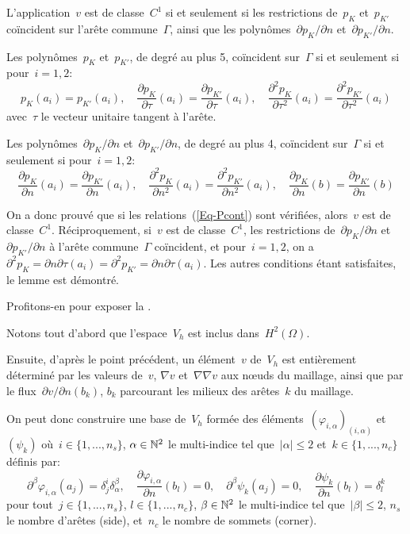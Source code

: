L'application~$v$ est de classe~$C^1$ si et seulement si les restrictions de~$p_K$ et~$p_{K'}$ coïncident sur l'arête commune~$\Gamma$, ainsi que les polynômes~$\partial p_K/\partial n$ et~$\partial p_{K'}/\partial n$.

Les polynômes~$p_K$ et~$p_{K'}$, de degré au plus 5, coïncident sur~$\Gamma$ si et seulement si pour~$i=1,2$:
\[ p_K(a_i)=p_{K'}(a_i), \quad
\dfrac{\partial p_K}{\partial\tau}(a_i)=\dfrac{\partial p_{K'}}{\partial\tau}(a_i), \quad
\dfrac{\partial^2 p_K}{\partial\tau^2}(a_i)=\dfrac{\partial^2 p_{K'}}{\partial \tau^2}(a_i)
\]
avec~$\tau$ le vecteur unitaire tangent à l'arête.

Les polynômes~$\partial p_K/\partial n$ et~$\partial p_{K'}/\partial n$, de degré au plus 4, coïncident sur~$\Gamma$ si et seulement si pour~$i=1,2$:
\[ 
\dfrac{\partial p_K}{\partial n}(a_i)=\dfrac{\partial p_{K'}}{\partial n}(a_i), \quad
\dfrac{\partial^2 p_K}{\partial n^2}(a_i)=\dfrac{\partial^2 p_{K'}}{\partial n^2}(a_i), \quad
\dfrac{\partial p_K}{\partial n}(b)=\dfrac{\partial p_{K'}}{\partial n}(b)\]

On a donc prouvé que si les relations~(\ref{Eq-Pcont}) sont vérifiées, alors~$v$ est de classe~$C^1$.
Réciproquement, si~$v$ est de classe~$C^1$, les restrictions de~$\partial p_K/\partial n$ et~$\partial p_{K'}/\partial n$ à l'arête commune~$\Gamma$ coïncident, et pour~$i=1,2$, on a~$\partial^2 p_K=\partial n\partial\tau (a_i)=\partial^2 p_{K'}=\partial n\partial\tau (a_i)$. Les autres conditions étant satisfaites, le lemme est démontré.

\medskip
Profitons-en pour exposer la .

Notons tout d'abord que l'espace~$V_h$ est inclus dans~$H^2(\Omega)$.

Ensuite, d'après le point précédent, un élément~$v$ de~$V_h$ est entièrement déterminé par les valeurs de~$v$, $\nabla v$ et~$\nabla \nabla v$ aux nœuds du maillage, ainsi que par le flux~$\partial v/\partial n(b_k)$, $b_k$ parcourant les milieux des arêtes~$k$ du maillage.

On peut donc construire une base de~$V_h$ formée des éléments~$(\varphi_{i,\alpha})_{(i,\alpha)}$ et~$(\psi_k)$ où~$i\in\{1, ..., n_s\}$, $\alpha\in\mathbb N^2$ le multi-indice tel que~$|\alpha|\le2$ et~$k\in\{1, ..., n_c\}$ définis par:
\[ \partial^\beta\varphi_{i,\alpha}(a_j)=\delta^i_j\delta^\beta_\alpha, \quad
\dfrac{\partial\varphi_{i,\alpha}}{\partial n}(b_l)=0, \quad
\partial^\beta\psi_k(a_j)=0, \quad
\dfrac{\partial\psi_k}{\partial n}(b_l)=\delta^k_l \]
pour tout~$j\in\{1, ..., n_s\}$, $l\in\{1, ..., n_c\}$, $\beta\in\mathbb N^2$ le multi-indice tel que~$|\beta|\le2$, $n_s$ le nombre d'arêtes (side), et~$n_c$ le nombre de sommets (corner).

